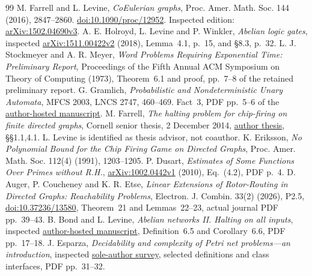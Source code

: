\documentclass[11pt]{article}
\begin{document}
\begin{thebibliography}{99}
 M. Farrell and L. Levine, \emph{CoEulerian graphs},
Proc. Amer. Math. Soc. 144 (2016), 2847--2860.
\href{https://doi.org/10.1090/proc/12952}{doi:10.1090/proc/12952}.
Inspected edition: \href{https://arxiv.org/abs/1502.04690v3}{arXiv:1502.04690v3}.
 A. E. Holroyd, L. Levine and P. Winkler,
\emph{Abelian logic gates}, inspected
\href{https://arxiv.org/abs/1511.00422v2}{arXiv:1511.00422v2} (2018),
Lemma~4.1, p.~15, and \S8.3, p.~32.
 L. J. Stockmeyer and A. R. Meyer,
\emph{Word Problems Requiring Exponential Time: Preliminary Report},
Proceedings of the Fifth Annual ACM Symposium on Theory of Computing (1973),
Theorem~6.1 and proof, pp.~7--8 of the retained preliminary report.
 G. Gramlich, \emph{Probabilistic and Nondeterministic Unary
Automata}, MFCS 2003, LNCS 2747, 460--469. Fact~3, PDF pp.~5--6 of the
\href{https://ggramlich.github.io/Publications/unaryMFCS03.pdf}{author-hosted manuscript}.
 M. Farrell, \emph{The halting problem for chip-firing on
finite directed graphs}, Cornell senior thesis, 2 December 2014,
\href{https://pi.math.cornell.edu/files/Research/SeniorTheses/farrellMatthewThesis.pdf}{author thesis},
\S\S1.1,4.1. L. Levine is identified as thesis advisor, not coauthor.
 K. Eriksson, \emph{No Polynomial Bound for the Chip Firing
Game on Directed Graphs}, Proc. Amer. Math. Soc. 112(4) (1991), 1203--1205.
 P. Dusart, \emph{Estimates of Some Functions Over Primes
without R.H.}, \href{https://arxiv.org/abs/1002.0442v1}{arXiv:1002.0442v1}
(2010), Eq.~(4.2), PDF p.~4.
 D. Auger, P. Coucheney and K. R. Etse,
\emph{Linear Extensions of Rotor-Routing in Directed Graphs: Reachability
Problems}, Electron. J. Combin. 33(2) (2026), P2.5,
\href{https://doi.org/10.37236/13580}{doi:10.37236/13580}, Theorem~21 and
Lemmas~22--23, actual journal PDF pp.~39--43.
 B. Bond and L. Levine, \emph{Abelian networks II. Halting on all
inputs}, inspected \href{https://lionellevine.github.io/abelian-networks-II-halting.pdf}{author-hosted manuscript},
Definition~6.5 and Corollary~6.6, PDF pp.~17--18.
 J. Esparza, \emph{Decidability and complexity of Petri net
problems---an introduction}, inspected
\href{https://lsv.ens-paris-saclay.fr/~demri/Esparza98.pdf}{sole-author survey},
selected definitions and class interfaces, PDF pp.~31--32.
\end{thebibliography}
\end{document}
